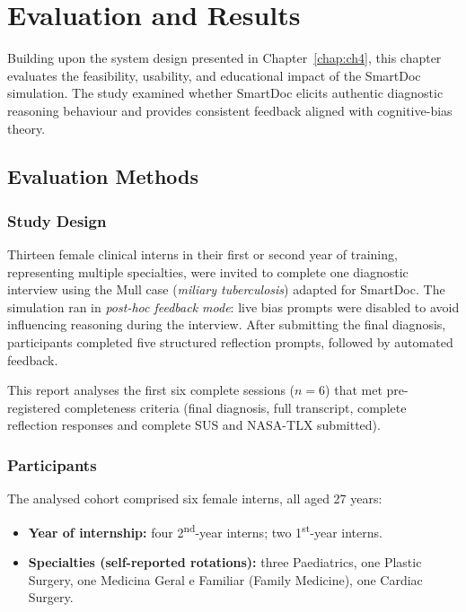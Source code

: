 \chapter{Evaluation and Results}
\label{chap:chap5}

Building upon the system design presented in Chapter~\ref{chap:ch4}, this chapter evaluates
the feasibility, usability, and educational impact of the SmartDoc simulation.
The study examined whether SmartDoc elicits authentic diagnostic reasoning behaviour and
provides consistent feedback aligned with cognitive-bias theory.

\section{Evaluation Methods}

\subsection{Study Design}
Thirteen female clinical interns in their first or second year of training, representing multiple
specialties, were invited to complete one diagnostic interview using the Mull case
(\textit{miliary tuberculosis}) adapted for SmartDoc.
The simulation ran in \textit{post-hoc feedback mode}: live bias prompts were
disabled to avoid influencing reasoning during the interview.
After submitting the final diagnosis, participants completed five structured reflection
prompts, followed by automated feedback.

This report analyses the first six complete sessions (\(n=6\)) that met pre-registered completeness criteria (final diagnosis, full transcript, complete reflection responses and complete SUS and NASA-TLX submitted).

\subsection{Participants}
The analysed cohort comprised six female interns, all aged 27 years:
\begin{itemize}
  \item \textbf{Year of internship:} four 2\textsuperscript{nd}-year interns; two 1\textsuperscript{st}-year interns.
  \item \textbf{Specialties (self-reported rotations):} three Paediatrics, one Plastic Surgery,
        one Medicina Geral e Familiar (Family Medicine), one Cardiac Surgery.
\end{itemize}


